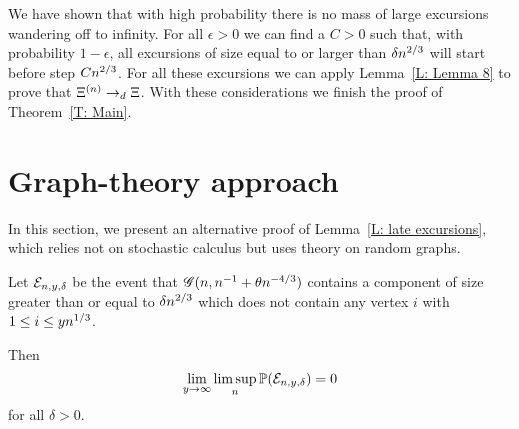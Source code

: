 We have shown that with high probability there is no mass of large excursions wandering off to infinity.
For all $\epsilon>0$ we can find a $C>0$ such that,
with probability $1-\epsilon$,
all excursions of size equal to or larger than $\delta n^{2 / 3}$ will start before step $Cn^{2 / 3}$.
For all these excursions we can apply Lemma~\ref{L: Lemma 8} to prove that $\Xi^{(n)} \rightarrow_d \Xi$.
With these considerations we finish the proof of Theorem~\ref{T: Main}.

\newpage
\section{Graph-theory approach}

In this section, we present an  alternative proof of Lemma~\ref{L: late excursions},
which relies not on stochastic calculus but uses theory on random graphs.

\begin{lemma} \label{L: Lemma 9}
	Let $\mathcal{E}_{n, y, \delta}$ be the event that $\mathscr{G}(n, n^{-1} + \theta n^{-4/3})$
	contains a component of size greater than or equal to $\delta n^{2 / 3}$
	which does not contain any vertex $i$ with $1 \leq i \leq yn^{1 / 3}$.
	
	Then
	\begin{equation}
	\lim_{y \rightarrow \infty} \limsup_n \mathbb{P}(\mathcal{E}_{n, y, \delta}) = 0
	\end{equation}
	for all $\delta > 0$.
\end{lemma}

